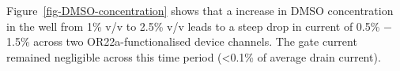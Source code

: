 \documentclass[
  a4paper,
]{scrbook}
\begin{document}
Figure~\ref{fig-DMSO-concentration} shows that a increase in DMSO
concentration in the well from 1\% v/v to 2.5\% v/v leads to a steep
drop in current of 0.5\% \(-\) 1.5\% across two OR22a-functionalised
device channels. The gate current remained negligible across this time
period (\textless0.1\% of average drain current).

\begin{figure}

\begin{minipage}[t]{0.11\linewidth}

{\centering 

~

}

\end{minipage}%
%
\begin{minipage}[t]{0.03\linewidth}

{\centering 


}

\end{minipage}%
%
\begin{minipage}[t]{0.01\linewidth}

{\centering 

~

}

\end{minipage}%
%
\begin{minipage}[t]{0.70\linewidth}

{\centering 

}
\end{minipage}
\end{figure}
\end{document}
